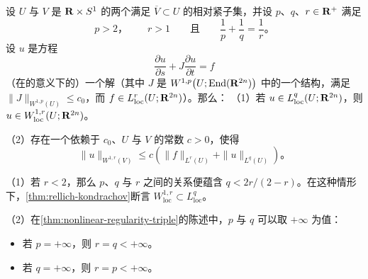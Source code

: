 \begin{lemma}\label{thm:nonlinear-regularity-triple}
设 $U$ 与 $V$ 是 $\mathbf{R}\times S^{1}$ 的两个满足 $\overline{V}\subset U$ 的相对紧\trOpen{}子集，并设 $p$、$q$、$r\in\mathbf{R}^{+}$ 满足
\[
p>2\text{，}\qquad r>1\qquad\text{且}\qquad\frac{1}{p}+\frac{1}{q}=\frac{1}{r}\text{。}
\]
设 $u$ 是方程
\[
\frac{\partial u}{\partial s}+J\frac{\partial u}{\partial t}=f
\]
（在\trDistribution{}的意义下的）一个解（其中 $J$ 是 $W^{1,p}\bigl(U;\operatorname{End}(\mathbf{R}^{2n})\bigr)$ 中的一个\trAlmostComplex{}结构，满足 $\|J\|_{W^{1,p}(U)}\le c_{0}$，而 $f\in L^{r}_{\mathrm{loc}}(U;\mathbf{R}^{2n})$）。那么：
（1）若 $u\in L^{q}_{\mathrm{loc}}(U;\mathbf{R}^{2n})$，则 $u\in W^{1,r}_{\mathrm{loc}}(U;\mathbf{R}^{2n})$。

（2）存在一个依赖于 $c_{0}$、$U$ 与 $V$ 的常数 $c>0$，使得
\[
\|u\|_{W^{1,r}(V)}\le c\left(\|f\|_{L^{r}(U)}+\|u\|_{L^{q}(U)}\right)\text{。}
\]
\end{lemma}

\begin{remark}\label{thm:nonlinear-regularity-remarks}
（1）若 $r<2$，那么 $p$、$q$ 与 $r$ 之间的关系便蕴含 $q<2r/(2-r)$。在这种情形下，\cref{thm:rellich-kondrachov}断言 $W^{1,r}_{\mathrm{loc}}\subset L^{q}_{\mathrm{loc}}$。

（2）在\cref{thm:nonlinear-regularity-triple}的陈述中，$p$ 与 $q$ 可以取 $+\infty$ 为值：
\begin{itemize}
\item 若 $p=+\infty$，则 $r=q<+\infty$。
\item 若 $q=+\infty$，则 $r=p<+\infty$。
\end{itemize}
\end{remark}

